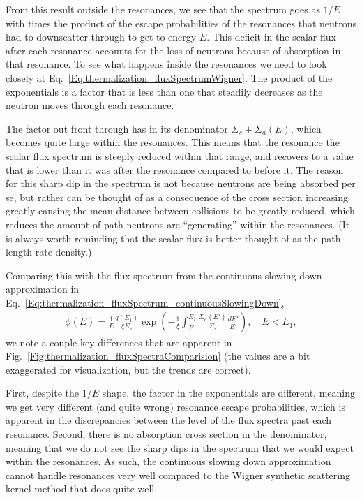From this result outside the resonances, we see that the spectrum goes as $1/E$ with times the product of the escape probabilities of the resonances that neutrons had to downscatter through to get to energy $E$. This deficit in the scalar flux after each resonance accounts for the loss of neutrons because of absorption in that resonance. To see what happens inside the resonances we need to look closely at Eq.~\eqref{Eq:thermalization_fluxSpectrumWigner}. The product of the exponentials is a factor that is less than one that steadily decreases as the neutron moves through each resonance. 

The factor out front through has in its denominator $ \Sigma_s + \Sigma_a(E)$, which becomes quite large within the resonances. This means that the resonance the scalar flux spectrum is steeply reduced within that range, and recovers to a value that is lower than it was after the resonance compared to before it. The reason for this sharp dip in the spectrum is not because neutrons are being absorbed per se, but rather can be thought of as a consequence of the cross section increasing greatly causing the mean distance between collisions to be greatly reduced, which reduces the amount of path neutrons are ``generating'' within the resonances. (It is always worth reminding that the scalar flux is better thought of as the path length rate density.)

Comparing this with the flux spectrum from the continuous slowing down approximation in Eq.~\eqref{Eq:thermalization_fluxSpectrum_continuousSlowingDown},
\begin{align}
  \phi(E) = \frac{1}{E} \frac{q(E_1)}{\xi \Sigma_s } \exp \left( -\frac{1}{\xi} \int_E^{E_1} \frac{\Sigma_a(E')}{\Sigma_s} \frac{dE'}{E'} \right) , \quad E < E_1 , \nonumber
\end{align}
we note a couple key differences that are apparent in Fig.~\ref{Fig:thermalization_fluxSpectraComparision} (the values are a bit exaggerated for visualization, but the trends are correct). 

First, despite the $1/E$ shape, the factor in the exponentials are different, meaning we get very different (and quite wrong) resonance escape probabilities, which is apparent in the discrepancies between the level of the flux spectra past each resonance. Second, there is no absorption cross section in the denominator, meaning that we do not see the sharp dips in the spectrum that we would expect within the resonances. As such, the continuous slowing down approximation cannot handle resonances very well compared to the Wigner synthetic scattering kernel method that does quite well.

